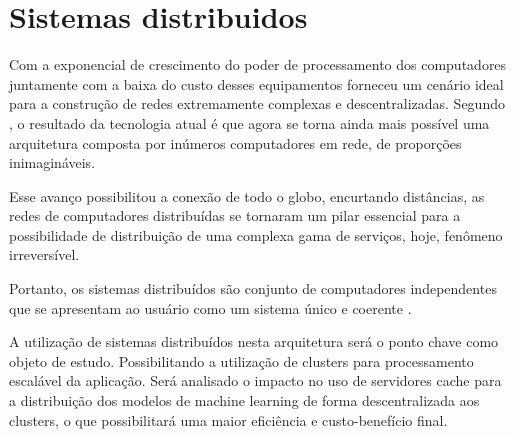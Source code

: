 
\chapter{\textbf{Sistemas distribuidos}} %

Com a exponencial de crescimento do poder de processamento dos computadores juntamente com a baixa do custo desses equipamentos forneceu um cenário ideal para a construção de redes extremamente complexas e descentralizadas. Segundo \cite{vanSteen1999}, o resultado da tecnologia atual é que agora se torna ainda mais possível uma arquitetura composta por inúmeros computadores em rede, de proporções inimagináveis.\par
Esse avanço possibilitou a conexão de todo o globo, encurtando distâncias, as redes de computadores distribuídas se tornaram um pilar essencial para a possibilidade de distribuição de uma complexa gama de serviços, hoje, fenômeno irreversível. \par
Portanto, os sistemas distribuídos são conjunto de computadores independentes que se apresentam ao usuário como um sistema único e coerente \cite{vanSteen2016}.\par
A utilização de sistemas distribuídos nesta arquitetura será o ponto chave como objeto de estudo. Possibilitando a utilização de clusters para processamento escalável da aplicação. Será analisado o impacto no uso de servidores cache para a distribuição dos modelos de machine learning de forma descentralizada aos clusters, o que possibilitará uma maior eficiência e custo-benefício final.\par


